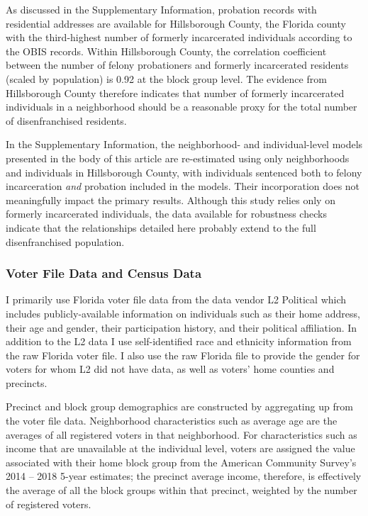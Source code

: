 \documentclass[
  12pt,
]{article}
\begin{document}
As discussed in the Supplementary Information, probation records with residential addresses are available for Hillsborough County, the Florida county with the third-highest number of formerly incarcerated individuals according to the OBIS records. Within Hillsborough County, the correlation coefficient between the number of felony probationers and formerly incarcerated residents (scaled by population) is 0.92 at the block group level. The evidence from Hillsborough County therefore indicates that number of formerly incarcerated individuals in a neighborhood should be a reasonable proxy for the total number of disenfranchised residents.

In the Supplementary Information, the neighborhood- and individual-level models presented in the body of this article are re-estimated using only neighborhoods and individuals in Hillsborough County, with individuals sentenced both to felony incarceration \emph{and} probation included in the models. Their incorporation does not meaningfully impact the primary results. Although this study relies only on formerly incarcerated individuals, the data available for robustness checks indicate that the relationships detailed here probably extend to the full disenfranchised population.

\hypertarget{voter-file-data-and-census-data}{%
\subsubsection*{Voter File Data and Census Data}\label{voter-file-data-and-census-data}}

I primarily use Florida voter file data from the data vendor L2 Political which includes publicly-available information on individuals such as their home address, their age and gender, their participation history, and their political affiliation. In addition to the L2 data I use self-identified race and ethnicity information from the raw Florida voter file. I also use the raw Florida file to provide the gender for voters for whom L2 did not have data, as well as voters' home counties and precincts.

Precinct and block group demographics are constructed by aggregating up from the voter file data. Neighborhood characteristics such as average age are the averages of all registered voters in that neighborhood. For characteristics such as income that are unavailable at the individual level, voters are assigned the value associated with their home block group from the American Community Survey's 2014 -- 2018 5-year estimates; the precinct average income, therefore, is effectively the average of all the block groups within that precinct, weighted by the number of registered voters.
\end{document}
